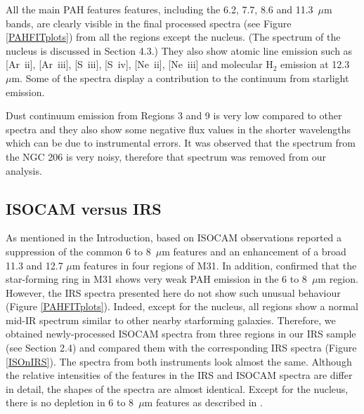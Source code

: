 
All the main PAH features features, including the 6.2, 7.7, 8.6 and 11.3~$\mu$m bands, are clearly visible in the final processed spectra 
(see Figure \ref{PAHFITplots}) from all the regions except the nucleus. (The spectrum of the nucleus is discussed in Section 4.3.)
They also show atomic line emission such as [Ar~{\sc ii}], [Ar~{\sc iii}], [S~{\sc iii}], [S~{\sc iv}], [Ne~{\sc ii}], [Ne~{\sc iii}] 
and molecular H$_{2}$ emission at 12.3~$\mu$m. Some of the spectra display a contribution to the continuum from starlight emission.

Dust continuum emission from Regions 3 and 9 is very low compared to other spectra and they also show some negative flux values in the shorter 
wavelengths which can be due to instrumental errors. It was observed that the spectrum from the NGC 206 is very noisy, therefore that spectrum 
was removed from our analysis. 


\subsection{ISOCAM versus IRS}
\label{sect:iso_vs_irs}


As mentioned in the Introduction, based on ISOCAM observations \citet{1998Cesarsky} reported a suppression of the common 
6 to 8~$\mu$m features and an enhancement of a broad 11.3 and 12.7 $\mu$m features in four regions of M31. 
In addition, \citet{Pagani_1999} confirmed that the star-forming ring in M31 shows very weak PAH emission in the 6 to 8~$\mu$m region. 
However, the IRS spectra presented here do not show such unusual behaviour (Figure \ref{PAHFITplots}). 
Indeed, except for the nucleus, all regions show a normal mid-IR spectrum similar to other nearby starforming galaxies. 
Therefore, we obtained newly-processed ISOCAM spectra from three regions in our IRS sample (see Section 2.4) 
and compared them with the corresponding IRS spectra (Figure \ref{ISOnIRS}). 
The spectra from both instruments look almost the same. Although the relative intensities of the features in the IRS and ISOCAM 
spectra are differ in detail, the shapes of the spectra are almost identical. Except for the nucleus, there is no depletion in 
6 to 8~$\mu$m features as described in \citet{1998Cesarsky}. 
	
